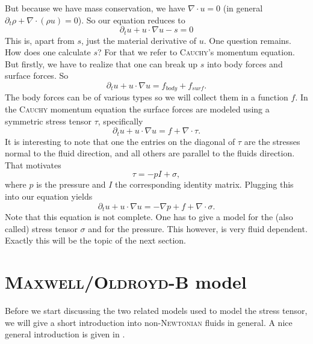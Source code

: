 \documentclass[12pt,a4paper,twoside, open=right]{scrreprt}
\theoremstyle{definition}
\theoremstyle{plain}
\begin{document}
But because we have mass conservation, we have $\nabla\cdot u =0$ (in general $\partial_t \rho + \nabla\cdot(\rho u) =0$). So our equation reduces to 
\begin{equation}
    \partial_t u+ u\cdot \nabla u -s =0
\end{equation}
This is, apart from $s$, just the material derivative of $u$.
One question remains. How does one calculate $s$? For that we refer to \textsc{Cauchy}'s momentum equation. But firstly, we have to realize that one can break up $s$ into body forces and surface forces. So 
\begin{equation}
   \partial_t u + u\cdot \nabla u = f_{body} +f_{surf} .
\end{equation}
The body forces can be of various types so we will collect them in a function $f$. In the \textsc{Cauchy} momentum equation the surface forces are modeled using a symmetric stress tensor $\tau$, specifically
\begin{equation}
    \partial_t u + u\cdot \nabla u = f + \nabla\cdot\tau.
\end{equation}
It is interesting to note that one the entries on the diagonal of $\tau$ are the stresses normal to the fluid direction, and all others are parallel to the fluids direction. That motivates 
\begin{equation}
    \tau = -pI+\sigma,
\end{equation}
where $p$ is the pressure and $I$ the corresponding identity matrix. Plugging this into our equation yields
\begin{equation}
    \partial_t u + u\cdot \nabla u = -\nabla p + f + \nabla\cdot\sigma.
\end{equation}
Note that this equation is not complete. One has to give a model for the (also called) stress tensor $\sigma$ and for the pressure. This however, is very fluid dependent. Exactly this will be the topic of the next section.
\section{\textsc{Maxwell/Oldroyd-B} model}
\label{sec:physics}
Before we start discussing the two related models used to model the stress tensor, we will give a short introduction into non-\textsc{Newtonian} fluids in general. A nice general introduction is given in \cite{Ouellette2013}.
\end{document}
